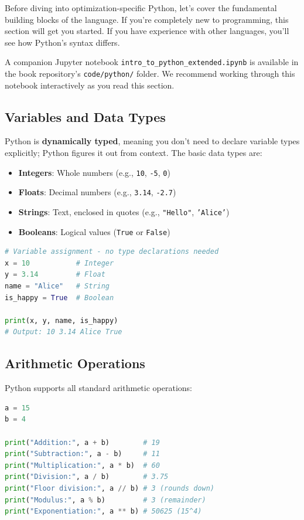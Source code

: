 Before diving into optimization-specific Python, let's cover the fundamental building blocks of the language. If you're completely new to programming, this section will get you started. If you have experience with other languages, you'll see how Python's syntax differs.

\begin{resource}
A companion Jupyter notebook \texttt{intro\_to\_python\_extended.ipynb} is available in the book repository's \texttt{code/python/} folder. We recommend working through this notebook interactively as you read this section.
\end{resource}

\subsection{Variables and Data Types}

Python is \textbf{dynamically typed}, meaning you don't need to declare variable types explicitly; Python figures it out from context. The basic data types are:

\begin{itemize}
\item \textbf{Integers}: Whole numbers (e.g., \texttt{10}, \texttt{-5}, \texttt{0})
\item \textbf{Floats}: Decimal numbers (e.g., \texttt{3.14}, \texttt{-2.7})
\item \textbf{Strings}: Text, enclosed in quotes (e.g., \texttt{"Hello"}, \texttt{'Alice'})
\item \textbf{Booleans}: Logical values (\texttt{True} or \texttt{False})
\end{itemize}

\begin{lstlisting}[language=Python]
# Variable assignment - no type declarations needed
x = 10           # Integer
y = 3.14         # Float
name = "Alice"   # String
is_happy = True  # Boolean

print(x, y, name, is_happy)
# Output: 10 3.14 Alice True
\end{lstlisting}

\subsection{Arithmetic Operations}

Python supports all standard arithmetic operations:

\begin{lstlisting}[language=Python]
a = 15
b = 4

print("Addition:", a + b)        # 19
print("Subtraction:", a - b)     # 11
print("Multiplication:", a * b)  # 60
print("Division:", a / b)        # 3.75
print("Floor division:", a // b) # 3 (rounds down)
print("Modulus:", a % b)         # 3 (remainder)
print("Exponentiation:", a ** b) # 50625 (15^4)
\end{lstlisting}

